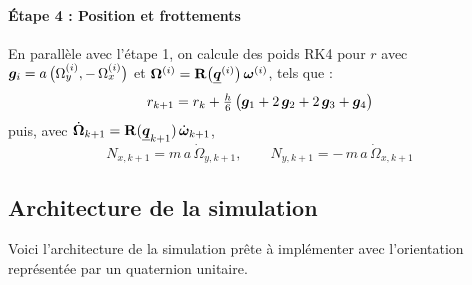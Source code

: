 \paragraph{Étape 4 : Position et frottements} En parallèle avec
l'étape 1, on calcule des poids RK4 pour $r$ avec
$\bm{g}_i = a\,\bigl(\Omega_y^{(i)}, -\,\Omega_x^{(i)}\bigr)$ et
$\bm{\Omega}^{(i)} = \mathbf{R}\bigl(\underline{\bm{q}}^{(i)}\bigr)\,
\bm{\omega}^{(i)}$, tels que :
\[
    r_{k+1} = r_k + \tfrac{h}{6}\,\bigl(\bm{g}_1 + 2\,\bm{g}_2
    + 2\,\bm{g}_3 + \bm{g}_4\bigr)
\]
puis, avec $\dot{\bm{\Omega}}_{k+1} = \mathbf{R}(\underline{\bm{q}}_{k+1})\,
\dot{\bm{\omega}}_{k+1}$,
\[
    N_{x,k+1} = m\,a\,\dot\Omega_{y,k+1},
    \qquad
    N_{y,k+1} = -\,m\,a\,\dot\Omega_{x,k+1}
\]

\subsection{Architecture de la simulation}

Voici l'architecture de la simulation prête à implémenter avec
l'orientation représentée par un quaternion unitaire.

